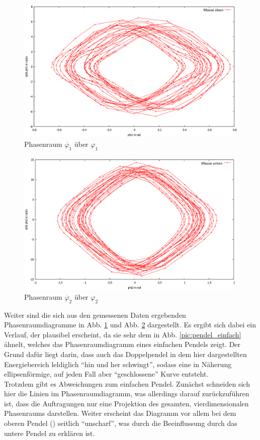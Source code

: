 \begin{figure}
        \includegraphics[width=.9\textwidth]{images/phi1_ueberphi1_neu.png}
\caption{Phasenraum $\dot{\varphi_1} $ über $\varphi_1$}
\label{phi1}
\end{figure}

\begin{figure}
        \includegraphics[width=.9\textwidth]{images/phi2_ueberphi2_neu.png}
\caption{Phasenraum $\dot{\varphi_2} $ über $\varphi_2$}
\label{phi2}
\end{figure}

Weiter sind die sich aus den gemessenen Daten ergebenden Phasenraumdiagramme in Abb. \ref{phi1} und Abb. \ref{phi2} dargestellt. Es ergibt sich dabei ein Verlauf, der plausibel erscheint, da sie sehr dem in Abb. \ref{pic:pendel_einfach} ähnelt, welches das Phasenraumdiagramm eines einfachen Pendels zeigt. Der Grund dafür liegt darin, dass auch das Doppelpendel in dem hier dargestellten Energiebereich leldiglich \enquote{hin und her schwingt}, sodass eine in Näherung ellipsenförmige, auf jeden Fall aber \enquote{geschlossene} Kurve entsteht. \\
Trotzdem gibt es Abweichungen zum einfachen Pendel. Zunächst schneiden sich hier die Linien im Phasenraumdiagramm, was allerdings darauf zurückzuführen ist, dass die Auftragungen nur eine Projektion des gesamten, vierdimensionalen Phasenraums darstellen. Weiter erscheint das Diagramm vor allem bei dem oberen Pendel () seitlich \enquote{unscharf}, was durch die Beeinflussung durch das untere Pendel zu erklären ist. 


